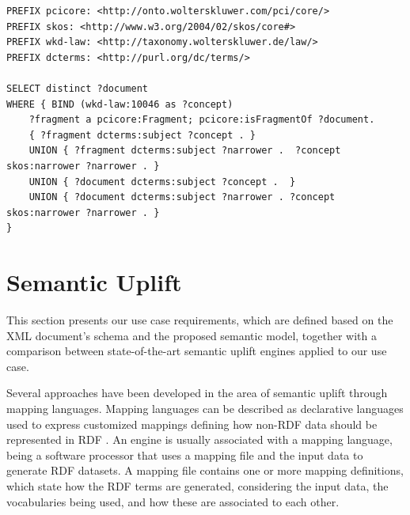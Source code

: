 \documentclass[runningheads]{llncs}
\begin{document}
\begin{lstlisting}[language=sparql, caption=Example of SPARQL query, frame = single, label={list:sparql}]
PREFIX pcicore: <http://onto.wolterskluwer.com/pci/core/>
PREFIX skos: <http://www.w3.org/2004/02/skos/core#>
PREFIX wkd-law: <http://taxonomy.wolterskluwer.de/law/> 
PREFIX dcterms: <http://purl.org/dc/terms/>

SELECT distinct ?document
WHERE { BIND (wkd-law:10046 as ?concept) 
    ?fragment a pcicore:Fragment; pcicore:isFragmentOf ?document.
    { ?fragment dcterms:subject ?concept . } 
    UNION { ?fragment dcterms:subject ?narrower .  ?concept skos:narrower ?narrower . } 
    UNION { ?document dcterms:subject ?concept .  } 
    UNION { ?document dcterms:subject ?narrower . ?concept skos:narrower ?narrower . }
}
\end{lstlisting}




\section{Semantic Uplift}\label{sec:semantic-uplift}

This section presents our use case requirements, which are defined based on the XML document’s schema and the proposed semantic model, together with a comparison between state-of-the-art semantic uplift engines applied to our use case.

Several approaches have been developed in the area of semantic uplift through mapping languages. Mapping languages can be described as declarative languages used to express customized mappings defining how non-RDF data should be represented in RDF \cite{DBLP:journals/ijwis/JuniorDBO17}. An engine is usually associated with a mapping language, being a software processor that uses a mapping file and the input data to generate RDF datasets. A mapping file contains one or more mapping definitions, which state how the RDF terms are generated, considering the input data, the vocabularies being used, and how these are associated to each other.
\end{document}
